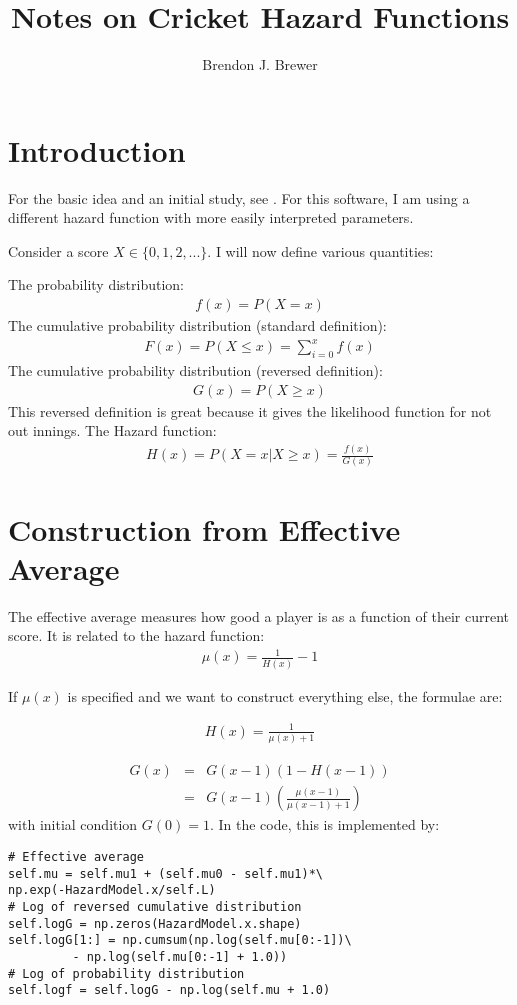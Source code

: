 \documentclass[letterpaper, 11pt]{article}
\title{Notes on Cricket Hazard Functions}
\author{Brendon J. Brewer}
\begin{document}
\maketitle

\section{Introduction}
For the basic idea and an initial study, see \citet{2008arXiv0801.4408B}.
For this software, I am using a different hazard function with more
easily interpreted parameters.

Consider a score $X \in \{0, 1, 2, ... \}$. I will now define various
quantities:

The probability distribution:
\begin{eqnarray}
f(x) = P(X = x)
\end{eqnarray}
The cumulative probability distribution (standard definition):
\begin{eqnarray}
F(x) = P(X \leq x) = \sum_{i=0}^x f(x)
\end{eqnarray}
The cumulative probability distribution (reversed definition):
\begin{eqnarray}
G(x) = P(X \geq x)
\end{eqnarray}
This reversed definition is great because it gives the likelihood function
for not out innings.
The Hazard function:
\begin{eqnarray}
H(x) = P(X = x | X \geq x) = \frac{f(x)}{G(x)}
\end{eqnarray}

\section{Construction from Effective Average}
The effective average measures how good a player is as a function
of their current score. It is related to the hazard function:
\begin{eqnarray}
\mu(x) = \frac{1}{H(x)} - 1
\end{eqnarray}

If $\mu(x)$ is specified and we want to construct everything else,
the formulae are:

\begin{eqnarray}
H(x) = \frac{1}{\mu(x) + 1}
\end{eqnarray}

\begin{eqnarray}
G(x) &=& G(x-1)\left(1 - H(x-1)\right) \\
&=& G(x-1)\left(\frac{\mu(x-1)}{\mu(x-1) + 1}\right)
\end{eqnarray}
with initial condition $G(0) = 1$. In the code, this is implemented
by:
\begin{lstlisting}
# Effective average
self.mu = self.mu1 + (self.mu0 - self.mu1)*\
np.exp(-HazardModel.x/self.L)
# Log of reversed cumulative distribution
self.logG = np.zeros(HazardModel.x.shape)
self.logG[1:] = np.cumsum(np.log(self.mu[0:-1])\
		 - np.log(self.mu[0:-1] + 1.0))
# Log of probability distribution
self.logf = self.logG - np.log(self.mu + 1.0)
\end{lstlisting}
\end{document}
